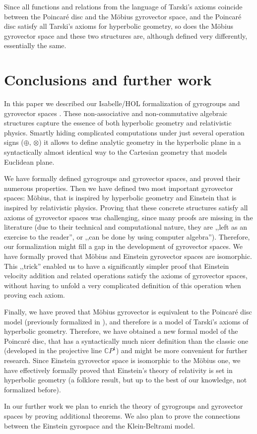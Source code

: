 \documentclass[a4paper]{article}
\theoremstyle{definition}
\begin{document}
Since all functions and relations from the language of Tarski's axioms
coincide between the Poincar\'e disc and the M\"obius gyrovector
space, and the Poincar\'e disc satisfy all Tarski's axioms for
hyperbolic geometry, so does the M\"obius gyrovector space and these
two structures are, although defined very differently, essentially the
same.

\section{Conclusions and further work}\label{sec:conclusions}

In this paper we described our Isabelle/HOL formalization of
gyrogroups and gyrovector spaces \cite{ungar-analytic}. These
non-associative and non-commutative algebraic structures capture the
essence of both hyperbolic geometry and relativistic physics. Smartly
hiding complicated computations under just several operation signs
($\oplus$, $\otimes$) it allows to define analytic geometry in the
hyperbolic plane in a syntactically almost identical way to the
Cartesian geometry that models Euclidean plane.

We have formally defined gyrogroups and gyrovector spaces, and proved
their numerous properties. Then we have defined two most important
gyrovector spaces: M\"obius, that is inspired by hyperbolic geometry
and Einstein that is inspired by relativistic physics. Proving that
these concrete structures satisfy all axioms of gyrovector spaces was
challenging, since many proofs are missing in the literature (due to
their technical and computational nature, they are ,,left as an
exercise to the reader'', or ,,can be done by using computer
algebra''). Therefore, our formalization might fill a gap in the
development of gyrovector spaces. We have formally proved that
M\"obius and Einstein gyrovector spaces are isomorphic. This ,,trick''
enabled us to have a significantly simpler proof that Einstein
velocity addition and related operations satisfy the axioms of
gyrovector spaces, without having to unfold a very complicated
definition of this operation when proving each axiom.

Finally, we have proved that M\"obius gyrovector is equivalent to the
Poincar\'e disc model (previously formalized in \cite{amai-poincare}),
and therefore is a model of Tarski's axioms of hyperbolic
geometry. Therefore, we have obtained a new formal model of the
Poincar\'e disc, that has a syntactically much nicer definition than
the classic one (developed in the projective line $\mathbb{C}P^1$) and
might be more convenient for further research. Since Einstein
gyrovector space is isomorphic to the M\"obius one, we have
effectively formally proved that Einstein's theory of relativity is
set in hyperbolic geometry (a folklore result, but up to the best of
our knowledge, not formalized before).

In our further work we plan to enrich the theory of gyrogroups and
gyrovector spaces by proving additional theorems. We also plan to
prove the connections between the Einstein gyrospace and the
Klein-Beltrami model.

\end{document}
